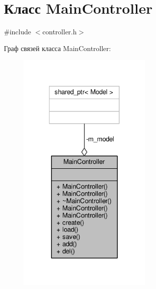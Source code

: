 \hypertarget{class_main_controller}{\section{Класс Main\-Controller}
\label{class_main_controller}
}


{\ttfamily \#include $<$controller.\-h$>$}



Граф связей класса Main\-Controller\-:
\nopagebreak
\begin{figure}[H]
\begin{center}
\leavevmode
\includegraphics[width=186pt]{class_main_controller__coll__graph}
\end{center}
\end{figure}
